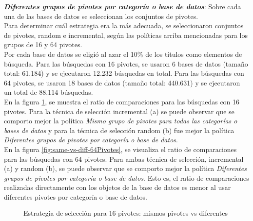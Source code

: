\textit{\textbf{Diferentes grupos de pivotes por categor\'ia o base de datos}}: Sobre cada una de las bases de datos se seleccionan los conjuntos de pivotes.\\

Para determinar cu\'al estrategia era la m\'as adecuada, se seleccionaron conjuntos de pivotes, random e incremental, seg\'un las pol\'iticas arriba mencionadas para los grupos de 16 y 64 pivotes.\\

Por cada base de datos se eligi\'o al azar el 10\% de los t\'itulos como elementos de b\'usqueda. Para las b\'usquedas con 16 pivotes, se usaron 6 bases de datos (tamaño total: 61.184) y se ejecutaron 12.232  b\'usquedas en total. Para las b\'usquedas con 64 pivotes, se usaron 18 bases de datos (tamaño total: 440.631) y se ejecutaron un total de 88.114 b\'usquedas.\\

En la figura \ref{fig:same-vs-diff-16Pivotes}, se muestra el ratio de comparaciones para las b\'usquedas con 16 pivotes. Para la t\'ecnica de selecci\'on incremental (a) se puede observar que se comporto mejor la pol\'itica \textit{Mismo grupo de pivotes para todas las categor\'ias o bases de datos} y para la t\'ecnica de selecci\'on random (b) fue mejor la pol\'itica \textit{Diferentes grupos de pivotes por categor\'ia o base de datos}.\\

En la figura \ref{fig:same-vs-diff-64Pivotes}, se visualiza el ratio de comparaciones para las b\'usquedas con 64 pivotes. Para ambas t\'ecnica de selecci\'on, incremental (a) y random (b), se puede observar que se comporto mejor la pol\'itica \textit{Diferentes grupos de pivotes por categor\'ia o base de datos}. Esto es, el ratio de comparaciones realizadas directamente con los objetos de la base de datos es menor al usar diferentes pivotes por categor\'ia o base de datos.\\

\begin{figure}[H]
\centering
{}
		\caption{\small Estrategia de selecci\'on para 16 pivotes: mismos pivotes vs diferentes}
		\label{fig:same-vs-diff-16Pivotes}
\end{figure}

